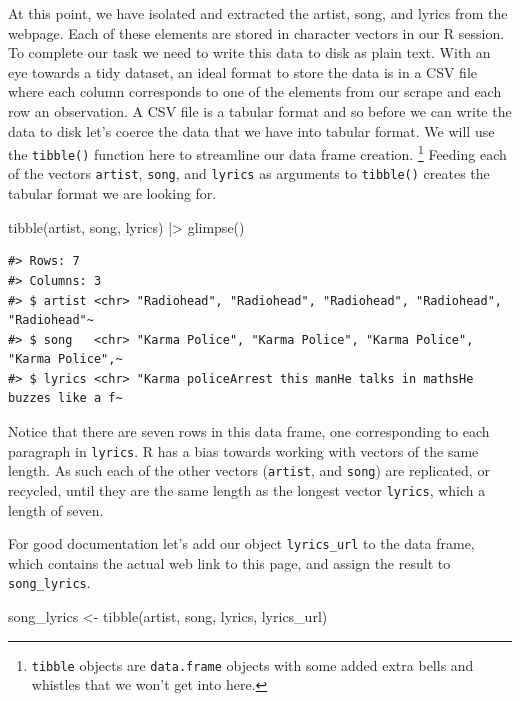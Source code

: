 \documentclass[
  letterpaper,
]{latex/krantz}
\newenvironment{Shaded}{\begin{snugshade}}{\end{snugshade}}
\newcommand{\FunctionTok}[1]{\textcolor[rgb]{0.28,0.35,0.67}{#1}}
\newcommand{\NormalTok}[1]{\textcolor[rgb]{0.00,0.23,0.31}{#1}}
\newcommand{\OtherTok}[1]{\textcolor[rgb]{0.00,0.23,0.31}{#1}}
\newcommand{\SpecialCharTok}[1]{\textcolor[rgb]{0.37,0.37,0.37}{#1}}
\begin{document}
At this point, we have isolated and extracted the artist, song, and
lyrics from the webpage. Each of these elements are stored in character
vectors in our R session. To complete our task we need to write this
data to disk as plain text. With an eye towards a tidy dataset, an ideal
format to store the data is in a CSV file where each column corresponds
to one of the elements from our scrape and each row an observation. A
CSV file is a tabular format and so before we can write the data to disk
let's coerce the data that we have into tabular format. We will use the
\texttt{tibble()} function here to streamline our data frame creation.
\footnote{\texttt{tibble} objects are \texttt{data.frame} objects with
  some added extra bells and whistles that we won't get into here.}
Feeding each of the vectors \texttt{artist}, \texttt{song}, and
\texttt{lyrics} as arguments to \texttt{tibble()} creates the tabular
format we are looking for.

\begin{Shaded}
\begin{Highlighting}[]
\FunctionTok{tibble}\NormalTok{(artist, song, lyrics) }\SpecialCharTok{|\textgreater{}} 
  \FunctionTok{glimpse}\NormalTok{()}
\end{Highlighting}
\end{Shaded}

\begin{verbatim}
#> Rows: 7
#> Columns: 3
#> $ artist <chr> "Radiohead", "Radiohead", "Radiohead", "Radiohead", "Radiohead"~
#> $ song   <chr> "Karma Police", "Karma Police", "Karma Police", "Karma Police",~
#> $ lyrics <chr> "Karma policeArrest this manHe talks in mathsHe buzzes like a f~
\end{verbatim}

Notice that there are seven rows in this data frame, one corresponding
to each paragraph in \texttt{lyrics}. R has a bias towards working with
vectors of the same length. As such each of the other vectors
(\texttt{artist}, and \texttt{song}) are replicated, or recycled, until
they are the same length as the longest vector \texttt{lyrics}, which a
length of seven.

For good documentation let's add our object \texttt{lyrics\_url} to the
data frame, which contains the actual web link to this page, and assign
the result to \texttt{song\_lyrics}.

\begin{Shaded}
\begin{Highlighting}[]
\NormalTok{song\_lyrics }\OtherTok{\textless{}{-}} \FunctionTok{tibble}\NormalTok{(artist, song, lyrics, lyrics\_url)}
\end{Highlighting}
\end{Shaded}
\end{document}
